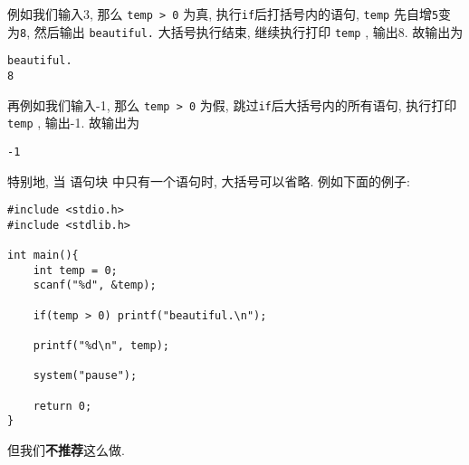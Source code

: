             例如我们输入3, 那么 \texttt{temp > 0} 为真, 执行\texttt{if}后打括号内的语句, \texttt{temp} 先自增\texttt{5}变为\texttt{8}, 然后输出 \texttt{beautiful.} 大括号执行结束, 继续执行打印 \texttt{temp} , 输出8. 故输出为
\begin{lstlisting}
beautiful.
8
\end{lstlisting}
            再例如我们输入-1, 那么 \texttt{temp > 0} 为假, 跳过\texttt{if}后大括号内的所有语句, 执行打印 \texttt{temp} , 输出-1. 故输出为
\begin{lstlisting}
-1
\end{lstlisting}

            特别地, 当 语句块 中只有一个语句时, 大括号可以省略. 例如下面的例子:
\begin{lstlisting}
#include <stdio.h>
#include <stdlib.h>

int main(){
    int temp = 0;
    scanf("%d", &temp);

    if(temp > 0) printf("beautiful.\n");

    printf("%d\n", temp);
    
    system("pause");

    return 0;
}
\end{lstlisting}

            但我们\textbf{不推荐}这么做.

